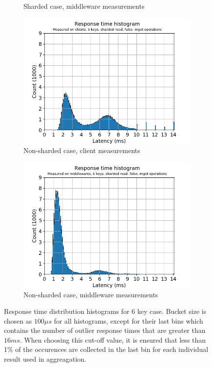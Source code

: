 \documentclass[11pt,a4paper]{article}
\begin{document}
\begin{figure}[h]
\begin{subfigure}{.5\textwidth}
  \caption{Sharded case, middleware measurements}
  \label{fig:gmg-hist6-true-mget_middlewares}
\end{subfigure}
\begin{subfigure}{.5\textwidth}
  \centering
  \includegraphics[width=1.0\linewidth ,trim={5px 0px 20px 0px},clip]{img/plot/gmg-hist6-false-mget_clients.png}
  \caption{Non-sharded case, client measurements}
  \label{fig:gmg-hist6-false-mget_clients}
\end{subfigure}%
\begin{subfigure}{.5\textwidth}
  \centering
  \includegraphics[width=1.0\linewidth ,trim={5px 0px 20px 0px},clip]{img/plot/gmg-hist6-false-mget_middlewares.png}
  \caption{Non-sharded case, middleware measurements}
  \label{fig:gmg-hist6-false-mget_middlewares}
\end{subfigure}
\caption{Response time distribution histograms for 6 key case. Bucket size is chosen as $100\mu s$ for all histograms, except for their last bins which contains the number of outlier response times that are greater than $16ms$. When choosing this cut-off value, it is ensured that less than 1\% of the occurences are collected in the last bin for each individual result used in aggreagation.}
\label{fig:gmg-hist6}
\end{figure}
\end{document}
